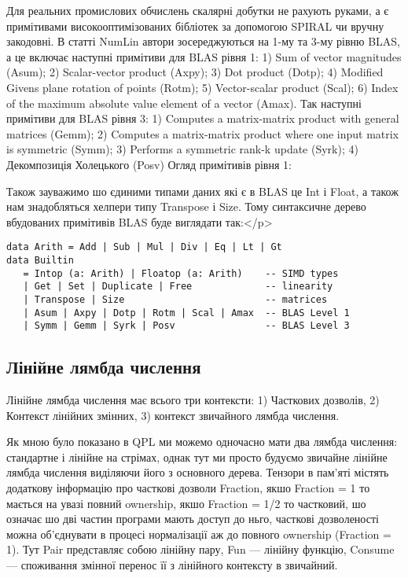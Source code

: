 \documentclass{article}
\begin{document}
Для реальних промислових обчислень скалярні добутки не рахують руками,
а є примітивами високооптимізованих бібліотек за допомогою SPIRAL чи вручну
закодовні. В статті NumLin автори зосереджуються на 1-му та 3-му рівню
BLAS, а це включає наступні примітиви для BLAS рівня 1:
1) Sum of vector magnitudes (Asum);
2) Scalar-vector product (Axpy);
3) Dot product (Dotp);
4) Modified Givens plane rotation of points (Rotm);
5) Vector-scalar product (Scal);
6) Index of the maximum absolute value element of a vector (Amax).
Так наступні примітиви для BLAS рівня 3:
1) Computes a matrix-matrix product with general matrices (Gemm);
2) Computes a matrix-matrix product where one input matrix is symmetric (Symm);
3) Performs a symmetric rank-k update (Syrk);
4) Декомпозиція Холецького (Posv)
Огляд примітивів рівня 1:

Також зауважимо шо єдиними типами даних які є в BLAS це Int і Float,
а також нам знадобляться хелпери типу Transpose і Size.
Тому синтаксичне дерево вбудованих примітивів BLAS буде виглядати так:</p>

\begin{lstlisting}
data Arith = Add | Sub | Mul | Div | Eq | Lt | Gt
data Builtin
   = Intop (a: Arith) | Floatop (a: Arith)    -- SIMD types
   | Get | Set | Duplicate | Free             -- linearity
   | Transpose | Size                         -- matrices
   | Asum | Axpy | Dotp | Rotm | Scal | Amax  -- BLAS Level 1
   | Symm | Gemm | Syrk | Posv                -- BLAS Level 3
\end{lstlisting}

\subsection{Лінійне лямбда числення}
Лінійне лямбда числення має всього три контексти: 1) Часткових дозволів,
2) Контекст лінійних змінних, 3) контекст звичайного лямбда числення.

Як мною було показано в QPL ми можемо одночасно мати два лямбда числення:
стандартне і лінійне на стрімах, однак тут ми просто будуємо звичайне лінійне лямбда
числення виділяючи його з основного дерева. Тензори в пам'яті містять додаткову
інформацію про часткові дозволи Fraction, якшо Fraction = 1
то мається на увазі повний ownership, якшо Fraction = 1/2 то частковий, шо означає
шо дві частин програми мають доступ до ньго, часткові дозволеності можна об'єднувати
в процесі нормалізації аж до повного ownership (Fraction = 1). Тут Pair представляє собою
лінійну пару, Fun --- лінійну функцію, Consume --- споживання змінної
перенос її з лінійного контексту в звичайний.
\end{document}
